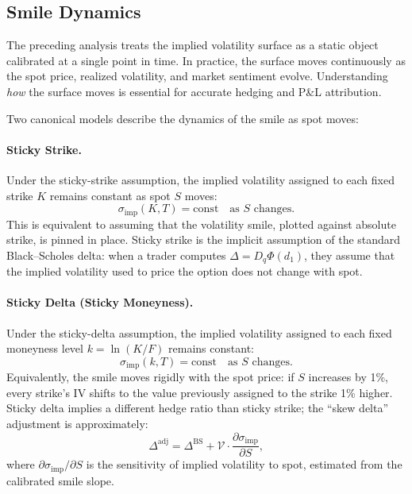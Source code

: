 \documentclass[11pt,a4paper]{article}
\begin{document}
\subsection{Smile Dynamics}\label{subsec:smile_dynamics}

The preceding analysis treats the implied volatility surface as a static object calibrated at a single point in time. In practice, the surface moves continuously as the spot price, realized volatility, and market sentiment evolve. Understanding \emph{how} the surface moves is essential for accurate hedging and P\&L attribution.

Two canonical models describe the dynamics of the smile as spot moves:

\paragraph{Sticky Strike.}
Under the sticky-strike assumption, the implied volatility assigned to each fixed strike $K$ remains constant as spot $S$ moves:
\begin{equation}\label{eq:sticky_strike}
    \sigma_{\text{imp}}(K, T) = \text{const} \quad \text{as } S \text{ changes}.
\end{equation}
This is equivalent to assuming that the volatility smile, plotted against absolute strike, is pinned in place. Sticky strike is the implicit assumption of the standard Black--Scholes delta: when a trader computes $\Delta = D_q \Phi(d_1)$, they assume that the implied volatility used to price the option does not change with spot.

\paragraph{Sticky Delta (Sticky Moneyness).}
Under the sticky-delta assumption, the implied volatility assigned to each fixed moneyness level $k = \ln(K/F)$ remains constant:
\begin{equation}\label{eq:sticky_delta}
    \sigma_{\text{imp}}(k, T) = \text{const} \quad \text{as } S \text{ changes}.
\end{equation}
Equivalently, the smile moves rigidly with the spot price: if $S$ increases by 1\%, every strike's IV shifts to the value previously assigned to the strike 1\% higher. Sticky delta implies a different hedge ratio than sticky strike; the ``skew delta'' adjustment is approximately:
\begin{equation}\label{eq:skew_adjusted_delta}
    \Delta^{\text{adj}} = \Delta^{\text{BS}} + \mathcal{V} \cdot \frac{\partial \sigma_{\text{imp}}}{\partial S},
\end{equation}
where $\partial \sigma_{\text{imp}} / \partial S$ is the sensitivity of implied volatility to spot, estimated from the calibrated smile slope.
\end{document}
